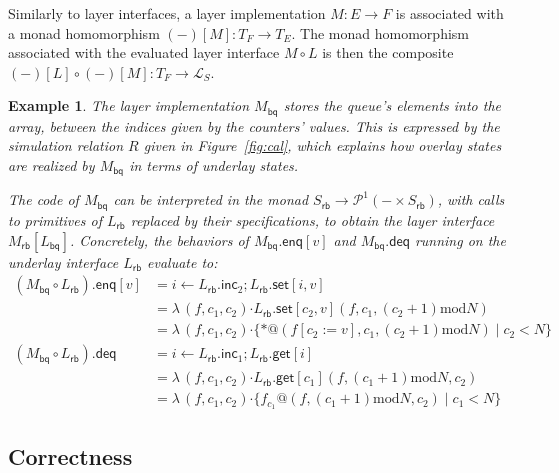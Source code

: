 \documentclass[11pt,oneside,draft]{book}
\newtheorem{example}[theorem]{Example}
\theoremstyle{definition}
\newcommand{\kw}[1]{\ensuremath{ \mathsf{#1} }}
\newcommand{\bdot}{\boldsymbol{\cdot}}
\begin{document}
Similarly to layer interfaces,
a layer implementation $M : E \rightarrow F$ is
associated with a monad homomorphism $(-)[M] : T_F \rightarrow T_E$.
The monad homomorphism associated with the evaluated
layer interface $M \circ L$
is then the composite
$(-)[L] \circ (-)[M] : T_F \rightarrow \mathcal{L}_S$.

\begin{example} \label{ex:bqimpl} %
The layer implementation $M_\kw{bq}$ 
stores the queue's elements into the array,
between the indices given by the counters' values.
This is expressed by the simulation relation $R$
given in Figure~\ref{fig:cal},
which explains how overlay states are realized by $M_\kw{bq}$ 
in terms of underlay states.

The code of $M_\kw{bq}$ can be interpreted in the monad
$
    S_\kw{rb} \rightarrow \mathcal{P}^1(- \times S_\kw{rb})
$,
with calls to primitives of $L_\kw{rb}$
replaced by their specifications,
to obtain the layer interface $M_\kw{rb}[L_\kw{bq}]$.
Concretely,
the behaviors of $M_\kw{bq}.\kw{enq}[v]$ and $M_\kw{bq}.\kw{deq}$
running on the underlay interface $L_\kw{rb}$
evaluate to:
\begin{align*}
  (M_\kw{bq} \circ L_\kw{rb}).{\kw{enq}[v]}
    &= i \leftarrow L_\kw{rb}.\kw{inc}_2 \mathbin{;}
        L_\kw{rb}.\kw{set}[i, v] \\
    &= \lambda \, (f, c_1, c_2) \bdot
       L_\kw{rb}.\kw{set}[c_2, v](f, c_1, (c_2+1) \mathbin{\mathrm{mod}} N) \\
    &= \lambda \, (f, c_1, c_2) \bdot
       \{ *@(f[c_2 := v], c_1, (c_2+1) \mathbin{\mathrm{mod}} N) \mid c_2 < N \}
  \\[1em]
  (M_\kw{bq} \circ L_\kw{rb}).\kw{deq}
    &= i \leftarrow L_\kw{rb}.\kw{inc}_1 \mathbin{;}
        L_\kw{rb}.\kw{get}[i] \\
    &= \lambda \, (f, c_1, c_2) \bdot
       L_\kw{rb}.\kw{get}[c_1](f,
          (c_1 + 1) \mathbin{\mathrm{mod}} N,
          c_2) \\
    &= \lambda \, (f, c_1, c_2) \bdot
       \{ f_{c_1}@(f, 
          (c_1 + 1) \mathbin{\mathrm{mod}} N,
          c_2) \mid
          c_1 < N \}
\end{align*}
\end{example}


\subsection{Correctness} %
\end{document}
